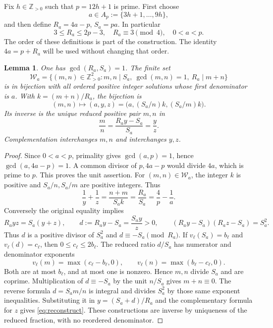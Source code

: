 \documentclass[11pt]{article}
\newtheorem{lemma}[theorem]{Lemma}
\theoremstyle{definition}\newtheorem{definition}[theorem]{Definition}
\theoremstyle{remark}\newtheorem{remark}[theorem]{Remark}
\newcommand{\Z}{\mathbb Z}\newcommand{\Q}{\mathbb Q}
\begin{document}
Fix \(h\in\Z_{>0}\) such that \(p=12h+1\) is prime.  First choose
\[
 a\in A_p:=\{3h+1,\ldots,9h\},
\]
and then define \(R_a=4a-p\), \(S_a=pa\).  In particular
\[
 3\le R_a\le2p-3,\quad R_a\equiv3\pmod4,\quad 0<a<p.
\]
The order of these definitions is part of the construction.  The
identity \(4a=p+R_a\) will be used without changing that order.

\begin{lemma}\label{lem:units}
One has \(\gcd(R_a,S_a)=1\).  The finite set
\[
 \mathcal W_a=
 \{(m,n)\in\Z_{>0}^2:m,n\mid S_a,\ \gcd(m,n)=1,\
                         R_a\mid m+n\}
\]
is in bijection with all ordered positive integer solutions whose first
denominator is \(a\).  With \(k=(m+n)/R_a\), the bijection is
\begin{equation}\label{eq:reconstruct}
 (m,n)\longmapsto(a,y,z)
       =\bigl(a,(S_a/n)k,(S_a/m)k\bigr).
\end{equation}
Its inverse is the unique reduced positive pair \(m,n\) in
\[
 \frac mn=\frac{R_a y-S_a}{S_a}=\frac yz .
\]
Complementation interchanges \(m,n\) and interchanges \(y,z\).
\end{lemma}
\begin{proof}
Since \(0<a<p\), primality gives \(\gcd(a,p)=1\), hence
\(\gcd(a,4a-p)=1\).  A common divisor of \(p,4a-p\) would divide
\(4a\), which is prime to \(p\).  This proves the unit assertion.
For \((m,n)\in\mathcal W_a\), the integer \(k\) is positive and
\(S_a/n,S_a/m\) are positive integers.  Thus
\[
 \frac1y+\frac1z=\frac{n+m}{S_a k}=\frac{R_a}{S_a}
                   =\frac4p-\frac1a.
\]
Conversely the original equality implies
\[
 R_a yz=S_a(y+z),\qquad
 d:=R_a y-S_a=\frac{S_a y}{z}>0,\qquad
 (R_a y-S_a)(R_a z-S_a)=S_a^2.
\]
Thus \(d\) is a positive divisor of \(S_a^2\) and
\(d\equiv-S_a\pmod{R_a}\).  If \(v_\ell(S_a)=b_\ell\) and
\(v_\ell(d)=c_\ell\), then \(0\le c_\ell\le2b_\ell\).
The reduced ratio \(d/S_a\) has numerator and denominator exponents
\[
 v_\ell(m)=\max(c_\ell-b_\ell,0),\qquad
 v_\ell(n)=\max(b_\ell-c_\ell,0).
\]
Both are at most \(b_\ell\), and at most one is nonzero.  Hence \(m,n\)
divide \(S_a\) and are coprime.  Multiplication of
\(d\equiv-S_a\) by the unit \(n/S_a\) gives \(m+n\equiv0\).
The reverse formula \(d=S_a m/n\) is integral and divides \(S_a^2\)
by those same exponent inequalities.  Substituting it in
\(y=(S_a+d)/R_a\) and the complementary formula for \(z\)
gives \eqref{eq:reconstruct}.  These constructions are inverse by
uniqueness of the reduced fraction, with no reordered denominator.
\end{proof}
\end{document}
